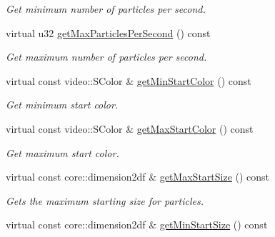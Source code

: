 \begin{DoxyCompactItemize}
\begin{DoxyCompactList}\small\item\em Get minimum number of particles per second. \end{DoxyCompactList}\item 
\hypertarget{classirr_1_1scene_1_1_c_particle_sphere_emitter_a08249ff26903c8bac6fb1ea0bc0e1eaa}{virtual u32 \hyperlink{classirr_1_1scene_1_1_c_particle_sphere_emitter_a08249ff26903c8bac6fb1ea0bc0e1eaa}{get\-Max\-Particles\-Per\-Second} () const }\label{classirr_1_1scene_1_1_c_particle_sphere_emitter_a08249ff26903c8bac6fb1ea0bc0e1eaa}

\begin{DoxyCompactList}\small\item\em Get maximum number of particles per second. \end{DoxyCompactList}\item 
\hypertarget{classirr_1_1scene_1_1_c_particle_sphere_emitter_adc5cf3914a8e32825169a872bed8bf73}{virtual const video\-::\-S\-Color \& \hyperlink{classirr_1_1scene_1_1_c_particle_sphere_emitter_adc5cf3914a8e32825169a872bed8bf73}{get\-Min\-Start\-Color} () const }\label{classirr_1_1scene_1_1_c_particle_sphere_emitter_adc5cf3914a8e32825169a872bed8bf73}

\begin{DoxyCompactList}\small\item\em Get minimum start color. \end{DoxyCompactList}\item 
\hypertarget{classirr_1_1scene_1_1_c_particle_sphere_emitter_a90c9bf60a2522f86a659e318e745cb92}{virtual const video\-::\-S\-Color \& \hyperlink{classirr_1_1scene_1_1_c_particle_sphere_emitter_a90c9bf60a2522f86a659e318e745cb92}{get\-Max\-Start\-Color} () const }\label{classirr_1_1scene_1_1_c_particle_sphere_emitter_a90c9bf60a2522f86a659e318e745cb92}

\begin{DoxyCompactList}\small\item\em Get maximum start color. \end{DoxyCompactList}\item 
\hypertarget{classirr_1_1scene_1_1_c_particle_sphere_emitter_a77e07eb5f121145472985b371a1ee44c}{virtual const core\-::dimension2df \& \hyperlink{classirr_1_1scene_1_1_c_particle_sphere_emitter_a77e07eb5f121145472985b371a1ee44c}{get\-Max\-Start\-Size} () const }\label{classirr_1_1scene_1_1_c_particle_sphere_emitter_a77e07eb5f121145472985b371a1ee44c}

\begin{DoxyCompactList}\small\item\em Gets the maximum starting size for particles. \end{DoxyCompactList}\item 
\hypertarget{classirr_1_1scene_1_1_c_particle_sphere_emitter_a671a71470c5c336600448c769773bdc1}{virtual const core\-::dimension2df \& \hyperlink{classirr_1_1scene_1_1_c_particle_sphere_emitter_a671a71470c5c336600448c769773bdc1}{get\-Min\-Start\-Size} () const }\label{classirr_1_1scene_1_1_c_particle_sphere_emitter_a671a71470c5c336600448c769773bdc1}


\end{DoxyCompactItemize}
